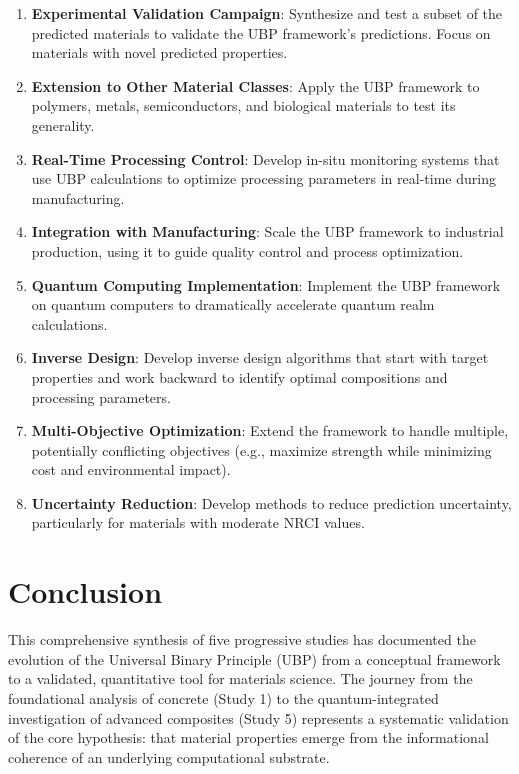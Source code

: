 \documentclass[11pt,a4paper]{article}
\begin{document}
\begin{enumerate}
    \item \textbf{Experimental Validation Campaign}: Synthesize and test a subset of the predicted materials to validate the UBP framework's predictions. Focus on materials with novel predicted properties.
    
    \item \textbf{Extension to Other Material Classes}: Apply the UBP framework to polymers, metals, semiconductors, and biological materials to test its generality.
    
    \item \textbf{Real-Time Processing Control}: Develop in-situ monitoring systems that use UBP calculations to optimize processing parameters in real-time during manufacturing.
    
    \item \textbf{Integration with Manufacturing}: Scale the UBP framework to industrial production, using it to guide quality control and process optimization.
    
    \item \textbf{Quantum Computing Implementation}: Implement the UBP framework on quantum computers to dramatically accelerate quantum realm calculations.
    
    \item \textbf{Inverse Design}: Develop inverse design algorithms that start with target properties and work backward to identify optimal compositions and processing parameters.
    
    \item \textbf{Multi-Objective Optimization}: Extend the framework to handle multiple, potentially conflicting objectives (e.g., maximize strength while minimizing cost and environmental impact).
    
    \item \textbf{Uncertainty Reduction}: Develop methods to reduce prediction uncertainty, particularly for materials with moderate NRCI values.
\end{enumerate}

\section{Conclusion}

This comprehensive synthesis of five progressive studies has documented the evolution of the Universal Binary Principle (UBP) from a conceptual framework to a validated, quantitative tool for materials science. The journey from the foundational analysis of concrete (Study 1) to the quantum-integrated investigation of advanced composites (Study 5) represents a systematic validation of the core hypothesis: that material properties emerge from the informational coherence of an underlying computational substrate.
\end{document}
